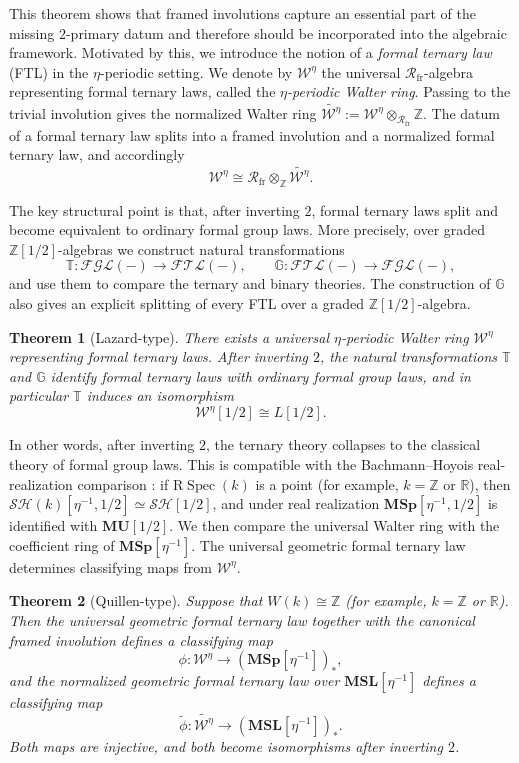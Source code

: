 \documentclass[a4paper]{amsart}
\theoremstyle{plain}
\newtheorem*{theorem*}{Theorem}
\theoremstyle{definition}
\newcommand{\MSp}{\mathbf{MSp}}
\newcommand{\MSL}{\mathbf{MSL}}
\newcommand{\MU}{\mathbf{MU}}
\newcommand{\etainv}{\eta^{-1}}
\newcommand{\MSpetainv}{{\MSp[\etainv]}}
\newcommand{\MSLetainv}{{\MSL[\etainv]}}
\newcommand{\W}{\mathcal{W}^{\eta}}
\newcommand{\SH}{\mathcal{SH}}
\newcommand{\ZZ}{\mathbb{Z}}
\newcommand{\Rfr}{\mathcal{R}_{\mathrm{fr}}}
\begin{document}
This theorem shows that framed involutions capture an essential part of the missing $2$-primary datum and therefore should be incorporated into the algebraic framework. Motivated by this, we introduce the notion of a \emph{formal ternary law} (FTL) in the $\eta$-periodic setting. We denote by $\W$ the universal $\Rfr$-algebra representing formal ternary laws, called the \emph{$\eta$-periodic Walter ring}. Passing to the trivial involution gives the normalized Walter ring $\widetilde{\W}:=\W\otimes_{\Rfr}\ZZ$. The datum of a formal ternary law splits into a framed involution and a normalized formal ternary law, and accordingly
\[
	\W\cong \Rfr\otimes_{\ZZ}\widetilde{\W}.
\]

The key structural point is that, after inverting $2$, formal ternary laws split and become equivalent to ordinary formal group laws. More precisely, over graded $\ZZ[1/2]$-algebras we construct natural transformations
\[
	\mathbb{T}:\mathcal{FGL}(-)\to\mathcal{FTL}(-),\qquad
	\mathbb{G}:\mathcal{FTL}(-)\to\mathcal{FGL}(-),
\]
and use them to compare the ternary and binary theories.
The construction of $\mathbb{G}$ also gives an explicit splitting of every FTL over a graded $\ZZ[1/2]$-algebra.
\begin{theorem*}[Lazard-type]
	There exists a universal $\eta$-periodic Walter ring $\W$ representing formal ternary laws. After inverting $2$, the natural transformations $\mathbb{T}$ and $\mathbb{G}$ identify formal ternary laws with ordinary formal group laws, and in particular $\mathbb{T}$ induces an isomorphism
	\[
		\W[1/2]\cong L[1/2].
	\]
\end{theorem*}

In other words, after inverting $2$, the ternary theory collapses to the classical theory of formal group laws. This is compatible with the Bachmann--Hoyois real-realization comparison \cite{bachmann2021norm}: if $\mathrm{R}\operatorname{Spec}(k)$ is a point (for example, $k=\ZZ$ or $\mathbb{R}$), then $\SH(k)[\etainv,1/2]\simeq \SH[1/2]$, and under real realization $\MSp[\etainv,1/2]$ is identified with $\MU[1/2]$. We then compare the universal Walter ring with the coefficient ring of $\MSpetainv$. The universal geometric formal ternary law determines classifying maps from $\W$.

\begin{theorem*}[Quillen-type]
	Suppose that $W(k)\cong \ZZ$ (for example, $k=\ZZ$ or $\mathbb{R}$). Then the universal geometric formal ternary law together with the canonical framed involution defines a classifying map
	\[
		\phi:\W\to (\MSpetainv)_*,
	\]
	and the normalized geometric formal ternary law over $\MSLetainv$ defines a classifying map
	\[
		\widetilde{\phi}:\widetilde{\W}\to (\MSLetainv)_*.
	\]
	Both maps are injective, and both become isomorphisms after inverting $2$.
\end{theorem*}
\end{document}
